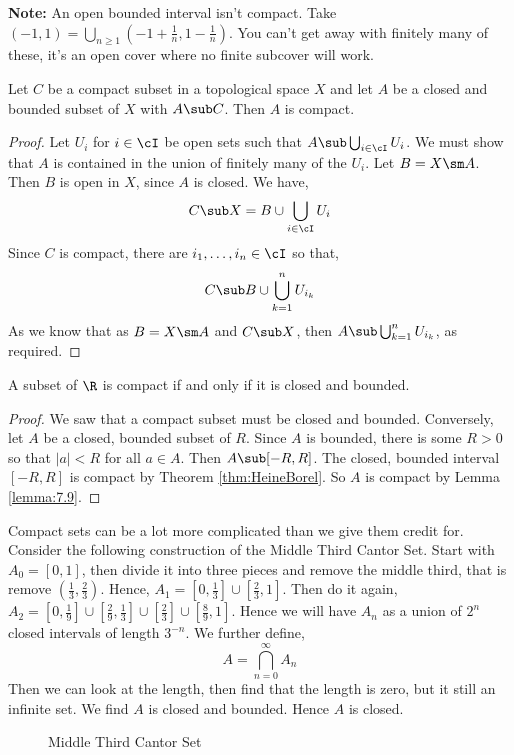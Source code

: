 \noindent
\textbf{Note:} An open bounded interval isn't compact. Take $(-1, 1) = \bigcup_{n \ge 1} \left( -1 + \frac{1}{n}, 1 - \frac{1}{n} \right)$. You can't get away with finitely many of these, it's an open cover where no finite subcover will work.

\begin{nlemma}[]
  Let $C$ be a compact subset in a topological space $X$ and let $A$ be a closed and bounded subset of $X$ with $A\sub C$. Then $A$ is compact.\label{lemma:7.9}
\end{nlemma}
\begin{proof}
  Let $U_i$ for $i \in \cI$ be open sets such that $A\sub \bigcup_{i \in \cI} U_i$. We must show that $A$ is contained in the union of finitely many of the $U_i$. Let $B = X\sm A$. Then $B$ is open in $X$, since $A$ is closed. We have,
  $$ C \sub X = B \cup \bigcup_{i \in \cI} U_i $$
  Since $C$ is compact, there are $i_1, \dots, i_n \in \cI$ so that,
  $$ C \sub B \cup \bigcup_{k=1}^n U_{i_k} $$
  As we know that as $B = X\sm A$ and $C \sub X$, then $A \sub \bigcup_{k=1}^n U_{i_k}$, as required.
\end{proof}

\begin{ncor}
   A subset of $\R$ is compact if and only if it is closed and bounded.
\end{ncor}
\begin{proof}
  We saw that a compact subset must be closed and bounded. Conversely, let $A$ be a closed, bounded subset of $R$. Since $A$ is bounded, there is some $R > 0$ so that $|a| < R$ for all $a \in A$. Then $A \sub [-R, R]$. The closed, bounded interval $[-R, R]$ is compact by Theorem \ref{thm:HeineBorel}. So $A$ is compact by Lemma \ref{lemma:7.9}.
\end{proof}

\noindent
Compact sets can be a lot more complicated than we give them credit for. Consider the following construction of the Middle Third Cantor Set. Start with $A_0 = [0, 1]$, then divide it into three pieces and remove the middle third, that is remove $(\frac{1}{3}, \frac{2}{3})$. Hence, $A_1 = [0, \frac{1}{3}]\cup [\frac{2}{3}, 1]$. Then do it again, $A_2 = [0, \frac{1}{9}] \cup [\frac{2}{9}, \frac{1}{3}] \cup [\frac{2}{3}]\cup [\frac{8}{9}, 1]$.
Hence we will have $A_n$ as a union of $2^n$ closed intervals of length $3^{-n}$. We further define,
$$ A = \bigcap_{n=0}^\infty A_n $$
Then we can look at the length, then find that the length is zero, but it still an infinite set. We find $A$ is closed and bounded. Hence $A$ is closed.\\
\begin{figure}[!ht]
\centering
{}
\caption{Middle Third Cantor Set}
\end{figure}